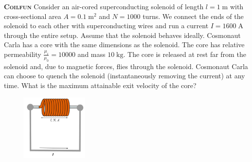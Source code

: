 \begin{problem}{\textbf{\textsc{Coilfun}}}
Consider an air-cored superconducting solenoid of length $l = 1\;\mathrm{m}$ with cross-sectional area $A = 0.1 \;\mathrm{m}^2$ and $N = 1000$ turns. We connect the ends of the solenoid to each other with superconducting wires and run a current $I  = 1600\;\mathrm{A}$ through the entire setup. Assume that the solenoid behaves ideally. 
\newline
\newline
Cosmonaut Carla has a core with the same dimensions as the solenoid. The core has relative permeability $\frac{\mu_i}{\mu_0} = 10000$ and mass $10\;\mathrm{kg}$. The core is released at rest far from the solenoid and, due to magnetic forces, flies through the solenoid. Cosmonaut Carla can choose to quench the solenoid (instantaneously removing the current) at any time. What is the maximum attainable exit velocity of the core? 


\FloatBarrier
\begin{figure}[!htbp]
\centering
\includegraphics[width=0.3\textwidth]{problems/figures/coilfun.png}
\end{figure}
\FloatBarrier

\end{problem}